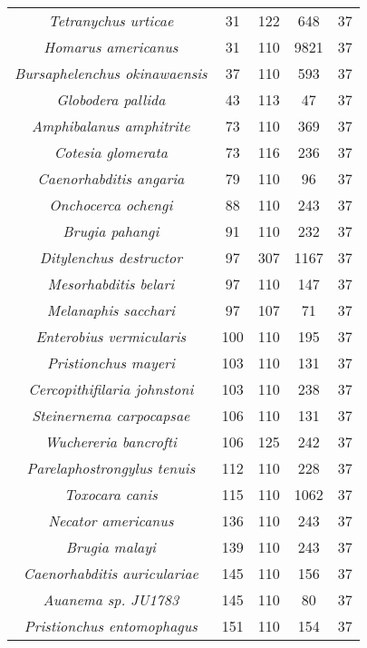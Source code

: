 \begin{longtable}[c]{|c|c|c|c|c|}
\textit{Tetranychus urticae}              & 31   & 122 & 648  & 37 \\
\textit{Homarus americanus}               & 31   & 110 & 9821 & 37 \\
\textit{Bursaphelenchus okinawaensis}     & 37   & 110 & 593  & 37 \\
\textit{Globodera pallida}                & 43   & 113 & 47   & 37 \\
\textit{Amphibalanus amphitrite}          & 73   & 110 & 369  & 37 \\
\textit{Cotesia glomerata}                & 73   & 116 & 236  & 37 \\
\textit{Caenorhabditis angaria}           & 79   & 110 & 96   & 37 \\
\textit{Onchocerca ochengi}               & 88   & 110 & 243  & 37 \\
\textit{Brugia pahangi}                   & 91   & 110 & 232  & 37 \\
\textit{Ditylenchus destructor}           & 97   & 307 & 1167 & 37 \\
\textit{Mesorhabditis belari}             & 97   & 110 & 147  & 37 \\
\textit{Melanaphis sacchari}              & 97   & 107 & 71   & 37 \\
\textit{Enterobius vermicularis}          & 100  & 110 & 195  & 37 \\
\textit{Pristionchus mayeri}              & 103  & 110 & 131  & 37 \\
\textit{Cercopithifilaria johnstoni}      & 103  & 110 & 238  & 37 \\
\textit{Steinernema carpocapsae}          & 106  & 110 & 131  & 37 \\
\textit{Wuchereria bancrofti}             & 106  & 125 & 242  & 37 \\
\textit{Parelaphostrongylus tenuis}       & 112  & 110 & 228  & 37 \\
\textit{Toxocara canis}                   & 115  & 110 & 1062 & 37 \\
\textit{Necator americanus}               & 136  & 110 & 243  & 37 \\
\textit{Brugia malayi}                    & 139  & 110 & 243  & 37 \\
\textit{Caenorhabditis auriculariae}      & 145  & 110 & 156  & 37 \\
\textit{Auanema sp. JU1783}               & 145  & 110 & 80   & 37 \\
\textit{Pristionchus entomophagus}        & 151  & 110 & 154  & 37 \\

\end{longtable}
